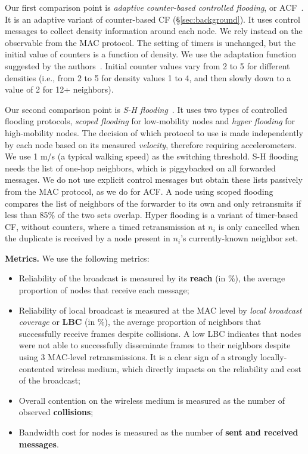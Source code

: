Our first comparison point is \emph{adaptive counter-based controlled flooding}, or ACF~\cite{2001:AAR:876878.879323}.
It is an adaptive variant of counter-based CF (\S\ref{sec:background}).
It uses control messages to collect density information around each node.
We rely instead on the observable from the MAC protocol.
The setting of timers is unchanged, but the initial value of counters is a function of density.
We use the adaptation function suggested by the authors~\cite[Figure~6]{2001:AAR:876878.879323}.
Initial counter values vary from 2 to 5 for different densities (i.e., from 2 to 5 for density values 1 to 4, and then slowly down to a value of 2 for 12+ neighbors).

Our second comparison point is \emph{S-H flooding}~\cite{adaptive_group_com_iscc02}.
It uses two types of controlled flooding protocols, \emph{scoped flooding} for low-mobility nodes and \emph{hyper flooding} for high-mobility nodes.
The decision of which protocol to use is made independently by each node based on its measured \emph{velocity}, therefore requiring accelerometers.
We use 1 m/s (a typical walking speed) as the switching threshold.
S-H flooding needs the list of one-hop neighbors, which is piggybacked on all forwarded messages.
We do not use explicit control messages but obtain these lists passively from the MAC protocol, as we do for ACF.
A node using scoped flooding compares the list of neighbors of the forwarder to its own and only retransmits if less than 85\% of the two sets overlap.
Hyper flooding is a variant of timer-based CF, without counters, where a timed retransmission at $n_i$ is only cancelled when the duplicate is received by a node present in $n_i$'s currently-known neighbor set.

\smallskip
\noindent
\textbf{Metrics.}
We use the following metrics:
\begin{itemize}
	\item Reliability of the broadcast is measured by its \textbf{reach} (in \%), the average proportion of nodes that receive each message;
	\item Reliability of local broadcast is measured at the MAC level by \emph{local broadcast coverage} or \textbf{LBC} (in \%), the average proportion of neighbors that successfully receive frames despite collisions.
	A low LBC indicates that nodes were not able to successfully disseminate frames to their neighbors despite using 3 MAC-level retransmissions.
	It is a clear sign of a strongly locally-contented wireless medium, which directly impacts on the reliability and cost of the broadcast;
	\item Overall contention on the wireless medium is measured as the number of observed \textbf{collisions};
	\item Bandwidth cost for nodes is measured as the number of \textbf{sent and received messages}.
\end{itemize}

